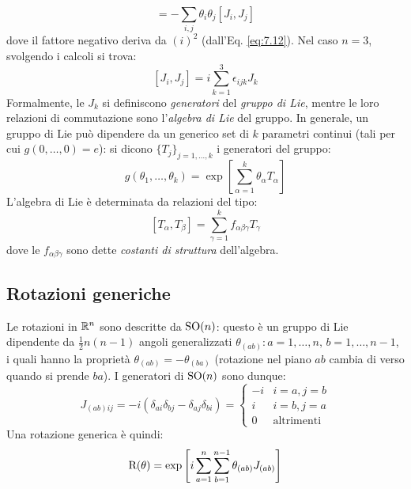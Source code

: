 \begin{equation}
	[\tens{A},\tens{B}] = - \sum_{i,j} \theta_i \theta_j \left[ J_i, J_j \right]
	\label{eq:7.14}
\end{equation}
dove il fattore negativo deriva da $ \left( i \right)^2 $ (dall'Eq. \ref{eq:7.12}).
Nel caso $ n = 3 $, svolgendo i calcoli si trova:
\begin{equation}
	\left[ J_i, J_j \right] = i \sum_{k = 1}^{3} \epsilon_{ijk} J_k
	\label{eq:7.15}
\end{equation}
Formalmente, le $ J_k $ si definiscono \textit{generatori} del \textit{gruppo di Lie}, mentre le loro relazioni di commutazione sono l'\textit{algebra di Lie} del gruppo. In generale, un gruppo di Lie può dipendere da un generico set di $ k $ parametri continui (tali per cui $ g(0,\dots,0) = e $): si dicono $ \{T_j\}_{j = 1,\dots,k} $ i generatori del gruppo:
\begin{equation}
	g(\theta_1, \dots, \theta_k) = \exp \left[ \sum_{\alpha = 1}^{k} \theta_{\alpha} T_{\alpha} \right]
	\label{eq:7.16}
\end{equation}
L'algebra di Lie è determinata da relazioni del tipo:
\begin{equation}
	\left[ T_{\alpha}, T_{\beta} \right] = \sum_{\gamma = 1}^{k} f_{\alpha \beta \gamma} T_{\gamma}
	\label{eq:7.17}
\end{equation}
dove le $ f_{\alpha \beta \gamma} $ sono dette \textit{costanti di struttura} dell'algebra.

\subsection{Rotazioni generiche}

Le rotazioni in $ \mathbb{R}^n $ sono descritte da $ \mathrm{SO}(n) $: questo è un gruppo di Lie dipendente da $ \frac{1}{2}n(n-1) $ angoli generalizzati $ \theta_{(ab)} : a = 1, \dots, n, \, b = 1, \dots, n-1 $, i quali hanno la proprietà $ \theta_{(ab)} = -\theta_{(ba)} $ (rotazione nel piano $ ab $ cambia di verso quando si prende $ ba $). I generatori di $ \mathrm{SO}(n) $ sono dunque:
\begin{equation}
	J_{(ab)ij} = -i \left( \delta_{ai} \delta_{bj} - \delta_{aj} \delta_{bi} \right) =
	\begin{cases}
		-i & i = a, j = b \\
		i & i = b, j = a \\
		0 & \text{altrimenti}
	\end{cases}
	\label{eq:7.18}
\end{equation}
Una rotazione generica è quindi:
\begin{equation}
	\mathrm{R}(\theta) = \exp \left[ i \sum_{a = 1}^{n} \sum_{b = 1}^{n - 1} \theta_{(ab)} J_{(ab)} \right]
	\label{eq:7.19}
\end{equation}


